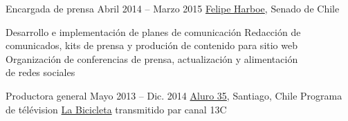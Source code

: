 \begin{joblist}
{		%
	}



\item[Encargada de prensa ]{Abril 2014 -- Marzo 2015}
     {
     \href{https://www.harboe.cl/}{Felipe Harboe}, Senado de Chile
     } 
	 {
                
		\iftbftiny \vspace{-0.5cm} \fi
			\begin{itemize}
			  \iftbftiny \setlength\itemsep{-3pt} \fi
			  \cvitem[\checkmark] Desarrollo e implementación de planes de comunicación
			  \cvitem[\checkmark] Redacción de comunicados, kits de prensa y produción de contenido para sitio web
			  \cvitem[\checkmark] Organización de conferencias de prensa, actualización y alimentación \\
			  de redes sociales \\
			\end{itemize}     
			
	}
    
    
    
\item[Productora general]{Mayo 2013 -- Dic. 2014}
     {     
     \href{https://www.aluro35.com/}  {Aluro 35}, Santiago, Chile
     }
     {Programa de télévision \href{http://www.13.cl/c/programas/la-bicicleta}{La Bicicleta} transmitido par canal 13C \\
			
}
\end{joblist}
